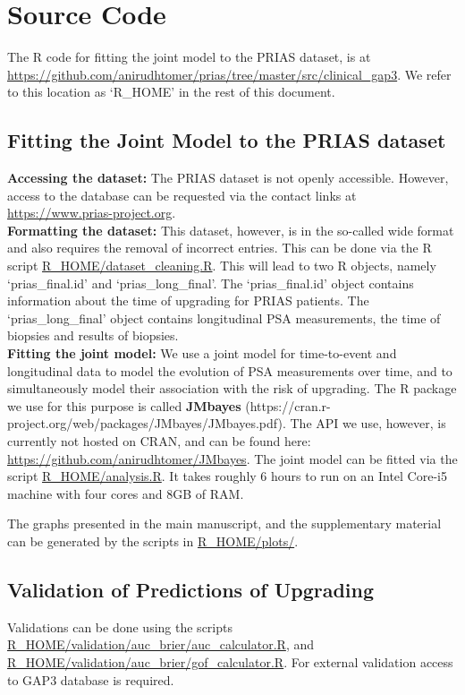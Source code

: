 \section{Source Code}
The R code for fitting the joint model to the PRIAS dataset, is at \url{https://github.com/anirudhtomer/prias/tree/master/src/clinical_gap3}. We refer to this location as `R\_HOME' in the rest of this document.

\subsection{Fitting the Joint Model to the PRIAS dataset}
\textbf{Accessing the dataset:}
The PRIAS dataset is not openly accessible. However, access to the database can be requested via the contact links at \url{https://www.prias-project.org}.\\

\textbf{Formatting the dataset:}
This dataset, however, is in the so-called wide format and also requires the removal of incorrect entries. This can be done via the R script \url{R_HOME/dataset_cleaning.R}. This will lead to two R objects, namely `prias\_final.id' and `prias\_long\_final'. The `prias\_final.id' object contains information about the time of upgrading for PRIAS patients. The `prias\_long\_final' object contains longitudinal PSA measurements, the time of biopsies and results of biopsies.\\

\textbf{Fitting the joint model:}
We use a joint model for time-to-event and longitudinal data to model the evolution of PSA measurements over time, and to simultaneously model their association with the risk of upgrading. The R package we use for this purpose is called \textbf{JMbayes} (https://cran.r-project.org/web/packages/JMbayes/JMbayes.pdf). The API we use, however, is currently not hosted on CRAN, and can be found here:
\url{https://github.com/anirudhtomer/JMbayes}. The joint model can be fitted via the script \url{R_HOME/analysis.R}. It takes roughly 6 hours to run on an Intel Core-i5 machine with four cores and 8GB of RAM. 

The graphs presented in the main manuscript, and the supplementary material can be generated by the scripts in \url{R_HOME/plots/}.

\subsection{Validation of Predictions of Upgrading}
Validations can be done using the scripts \url{R_HOME/validation/auc_brier/auc_calculator.R}, and \url{R_HOME/validation/auc_brier/gof_calculator.R}. For external validation access to GAP3 database is required.


